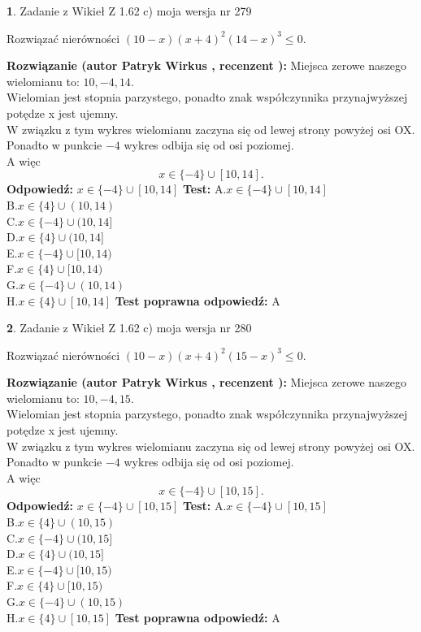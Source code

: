 \documentclass[12pt, a4paper]{article}
\theoremstyle{definition} %
\newtheorem{zad}{}
\newcommand{\zadStart}[1]{\begin{zad}#1\newline}
\newcommand{\zadStop}{\end{zad}}
\newcommand{\rozwStart}[2]{\noindent \textbf{Rozwiązanie (autor #1 , recenzent #2): }\newline}
\newcommand{\rozwStop}{\newline}
\newcommand{\odpStart}{\noindent \textbf{Odpowiedź:}\newline}
\newcommand{\odpStop}{\newline}
\newcommand{\testStart}{\noindent \textbf{Test:}\newline}
\newcommand{\testStop}{\newline}
\newcommand{\kluczStart}{\noindent \textbf{Test poprawna odpowiedź:}\newline}
\newcommand{\kluczStop}{\newline}
\begin{document}
\zadStart{Zadanie z Wikieł Z 1.62 c) moja wersja nr 279}

Rozwiązać nierówności $(10-x)(x+4)^{2}(14-x)^{3}\le0$.
\zadStop
\rozwStart{Patryk Wirkus}{}
Miejsca zerowe naszego wielomianu to: $10, -4, 14$.\\
Wielomian jest stopnia parzystego, ponadto znak współczynnika przy\linebreak najwyższej potędze x jest ujemny.\\ W związku z tym wykres wielomianu zaczyna się od lewej strony powyżej osi OX.\\
Ponadto w punkcie $-4$ wykres odbija się od osi poziomej.\\
A więc $$x \in \{-4\} \cup [10,14].$$
\rozwStop
\odpStart
$x \in \{-4\} \cup [10,14]$
\odpStop
\testStart
A.$x \in \{-4\} \cup [10,14]$\\
B.$x \in \{4\} \cup (10,14)$\\
C.$x \in \{-4\} \cup (10,14]$\\
D.$x \in \{4\} \cup (10,14]$\\
E.$x \in \{-4\} \cup [10,14)$\\
F.$x \in \{4\} \cup [10,14)$\\
G.$x \in \{-4\} \cup (10,14)$\\
H.$x \in \{4\} \cup [10,14]$
\testStop
\kluczStart
A
\kluczStop



\zadStart{Zadanie z Wikieł Z 1.62 c) moja wersja nr 280}

Rozwiązać nierówności $(10-x)(x+4)^{2}(15-x)^{3}\le0$.
\zadStop
\rozwStart{Patryk Wirkus}{}
Miejsca zerowe naszego wielomianu to: $10, -4, 15$.\\
Wielomian jest stopnia parzystego, ponadto znak współczynnika przy\linebreak najwyższej potędze x jest ujemny.\\ W związku z tym wykres wielomianu zaczyna się od lewej strony powyżej osi OX.\\
Ponadto w punkcie $-4$ wykres odbija się od osi poziomej.\\
A więc $$x \in \{-4\} \cup [10,15].$$
\rozwStop
\odpStart
$x \in \{-4\} \cup [10,15]$
\odpStop
\testStart
A.$x \in \{-4\} \cup [10,15]$\\
B.$x \in \{4\} \cup (10,15)$\\
C.$x \in \{-4\} \cup (10,15]$\\
D.$x \in \{4\} \cup (10,15]$\\
E.$x \in \{-4\} \cup [10,15)$\\
F.$x \in \{4\} \cup [10,15)$\\
G.$x \in \{-4\} \cup (10,15)$\\
H.$x \in \{4\} \cup [10,15]$
\testStop
\kluczStart
A
\kluczStop
\end{document}
